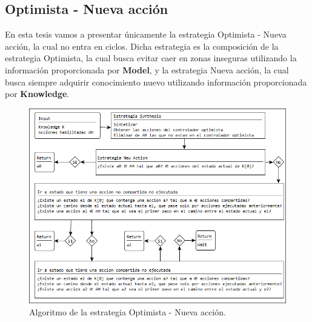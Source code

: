\subsection{Optimista - Nueva acción}

En esta tesis vamos a presentar únicamente la estrategia Optimista - Nueva acción, la cual no entra en ciclos. Dicha estrategia es la composición de la estrategia 
Optimista, la cual busca evitar caer en zonas inseguras utilizando la información proporcionada por \textbf{Model}, y la estrategia Nueva acción, la cual busca siempre 
adquirir conocimiento nuevo utilizando información proporcionada por \textbf{Knowledge}.

\begin{figure}[H]
  \centering
    \includegraphics[scale=0.8]{Imagenes/Algoritmo/Algoritmo_elegir_2.png}
  \caption{Algoritmo de la estrategia Optimista - Nueva acción.}
  \label{fig:Algoritmo_elegir_2}
\end{figure}

